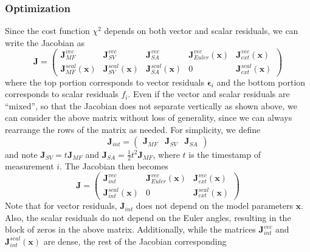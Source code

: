 \documentclass{article}
\begin{document}
\subsubsection{Optimization}

Since the cost function $\chi^2$ depends on both vector and scalar
residuals, we can write the Jacobian as
\begin{equation}
\mathbf{J} =
\left(
\begin{array}{ccccc}
\mathbf{J}_{MF}^{vec} & \mathbf{J}_{SV}^{vec} & \mathbf{J}_{SA}^{vec} & \mathbf{J}_{Euler}^{vec}(\mathbf{x}) & \mathbf{J}_{ext}^{vec}(\mathbf{x}) \\
\mathbf{J}_{MF}^{scal}(\mathbf{x}) & \mathbf{J}^{scal}_{SV}(\mathbf{x}) & \mathbf{J}^{scal}_{SA}(\mathbf{x}) & 0 & \mathbf{J}^{scal}_{ext}(\mathbf{x})
\end{array}
\right)
\end{equation}
where the top portion corresponds to vector residuals $\boldsymbol{\epsilon}_i$ and the bottom portion
corresponds to scalar residuals $f_i$. Even if the vector and scalar residuals are ``mixed'', so that
the Jacobian does not separate vertically as shown above, we can consider the above matrix
without loss of generality, since we can always rearrange the rows of the matrix as needed.
For simplicity, we define
\begin{equation}
\mathbf{J}_{int} =
\left(
\begin{array}{ccc}
\mathbf{J}_{MF} & \mathbf{J}_{SV} & \mathbf{J}_{SA}
\end{array}
\right)
\end{equation}
and note $\mathbf{J}_{SV} = t \mathbf{J}_{MF}$ and $\mathbf{J}_{SA} = \frac{1}{2} t^2 \mathbf{J}_{MF}$,
where $t$ is the timestamp of measurement $i$. The Jacobian then becomes
\begin{equation}
\mathbf{J} =
\left(
\begin{array}{ccc}
\mathbf{J}_{int}^{vec} & \mathbf{J}_{Euler}^{vec}(\mathbf{x}) & \mathbf{J}_{ext}^{vec}(\mathbf{x}) \\
\mathbf{J}_{int}^{scal}(\mathbf{x}) & 0 & \mathbf{J}^{scal}_{ext}(\mathbf{x})
\end{array}
\right)
\end{equation}
Note that for vector residuals, $\mathbf{J}_{int}$ does not depend on the model parameters
$\mathbf{x}$. Also, the scalar residuals do not depend on the Euler angles, resulting in the
block of zeros in the above matrix. Additionally, while the matrices $\mathbf{J}_{int}^{vec}$
and $\mathbf{J}_{int}^{scal}(\mathbf{x})$ are dense, the rest of the Jacobian corresponding
\end{document}
